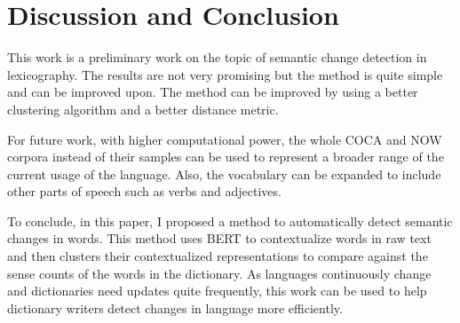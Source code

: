 \documentclass[11pt]{article}
\begin{document}
\section{Discussion and Conclusion}

This work is a preliminary work on the topic of semantic change detection in lexicography.
The results are not very promising but the method is quite simple and can be improved upon.
The method can be improved by using a better clustering algorithm and a better distance metric.

For future work, with higher computational power, the whole COCA and NOW corpora instead of their samples can be used to represent a broader range of the current usage of the language.
Also, the vocabulary can be expanded to include other parts of speech such as verbs and adjectives.

To conclude, in this paper, I proposed a method to automatically detect semantic changes in words.
This method uses BERT to contextualize words in raw text and then clusters their contextualized representations to compare against the sense counts of the words in the dictionary.
As languages continuously change and dictionaries need updates quite frequently, this work can be used to help dictionary writers detect changes in language more efficiently.



\end{document}
